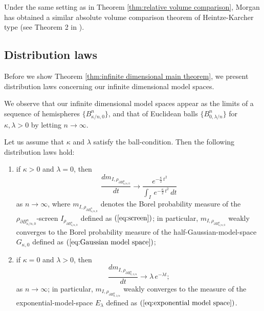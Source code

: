 \begin{rem}
Under the same setting as in Theorem \ref{thm:relative volume comparison},
Morgan \cite{Mo} has obtained a similar absolute volume comparison theorem of Heintze-Karcher type (see Theorem 2 in \cite{Mo}).
\end{rem}

\subsection{Distribution laws}\label{sec:Infinite dimensional model spaces and distribution laws}
Before we show Theorem \ref{thm:infinite dimensional main theorem},
we present distribution laws concerning our infinite dimensional model spaces.

We observe that
our infinite dimensional model spaces appear as the limits of a sequence of hemispheres $\{B^{n}_{\kappa/n,0}\}$,
and that of Euclidean balls $\{B^{n}_{0,\lambda/n}\}$ for $\kappa,\lambda>0$ by letting $n\to \infty$.
\begin{prop}\label{prop:ball distribution laws}
Let us assume that
$\kappa$ and $\lambda$ satisfy the ball-condition.
Then the following distribution laws hold:
\begin{enumerate}
\item if $\kappa>0$ and $\lambda=0$,
         then
         \begin{equation*}
         \frac{d m_{I,\rho_{  \partial B^{n}_{\kappa/n,0   }     }}    }{dt} \to \frac{e^{-\frac{\kappa}{2}\,t^{2}}}{\int_{I}\,e^{-\frac{\kappa}{2}\,t^{2}}\,    dt}
         \end{equation*}
         as $n\to \infty$,
         where $m_{I,\rho_{ \partial B^{n}_{\kappa/n,0   }}}$ denotes the Borel probability measure of the $\rho_{ \partial B^{n}_{\kappa/n,0   }}$-screen $I_{\rho_{ \partial B^{n}_{\kappa/n,0   }}}$ defined as $(\ref{eq:screen})$;
         in particular,
         $m_{I,\rho_{ \partial B^{n}_{\kappa/n,0   }}}$ weakly converges to the Borel probability measure of the half-Gaussian-model-space $G_{\kappa,0}$ defined as $(\ref{eq:Gaussian model space})$;
\item if $\kappa=0$ and $\lambda>0$,
         then
         \begin{equation*}
         \frac{d   m_{I,\rho_{  \partial B^{n}_{0, \lambda/n  }     }} }{dt} \to \lambda\, e^{-\lambda t};
         \end{equation*}
         as $n\to \infty$;
         in particular,
         $m_{I,\rho_{  \partial B^{n}_{0,\lambda/n   }}}$ weakly converges to the measure of the exponential-model-space $E_{\lambda}$ defined as $(\ref{eq:exponential model space})$.
\end{enumerate}
\end{prop}
